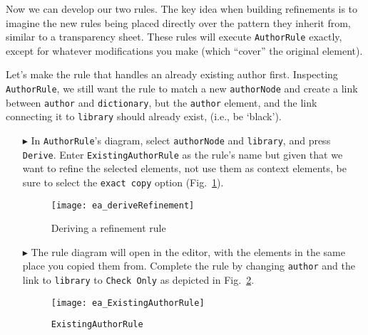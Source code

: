 \newpage

Now we can develop our two rules. The key idea when building refinements is to imagine the new rules being placed directly over the pattern they inherit
from, similar to a transparency sheet. These rules will execute \texttt{AuthorRule} exactly, except for whatever modifications you make (which ``cover'' the
original element).

Let's make the rule that handles an already existing author first. Inspecting \texttt{AuthorRule}, we still want the rule to match a new \texttt{authorNode}
and create a link between \texttt{author} and \texttt{dictionary}, but the \texttt{author} element, and the link connecting it to \texttt{library} should
already exist, (i.e., be `black').

\begin{itemize}

\subsubsection{ExistingAuthorRule} %

\item[$\blacktriangleright$] In \texttt{AuthorRule}'s diagram, select \texttt{authorNode} and \texttt{library}, and press \texttt{Derive}. Enter
\texttt{ExistingAuthorRule} as the rule's name but given that we want to refine the selected elements, not use them as context elements,
be sure to select the \texttt{exact copy} option (Fig.~\ref{ea:deriveRefinement}).

\begin{figure}[htbp]
\begin{center}
  \texttt{[image: ea\_deriveRefinement]}
  \caption{Deriving a refinement rule}
  \label{ea:deriveRefinement}
\end{center}
\end{figure}

\item[$\blacktriangleright$] The rule diagram will open in the editor, with the elements in the same place you copied them from. Complete the rule by changing
\texttt{author} and the link to \texttt{library} to \texttt{Check Only} as depicted in Fig.~\ref{ea:existingAuthorRule}.

\begin{figure}[htbp]
\begin{center}
  \texttt{[image: ea\_ExistingAuthorRule]}
  \caption{\texttt{ExistingAuthorRule}}
  \label{ea:existingAuthorRule}
\end{center}
\end{figure}


\end{itemize}
